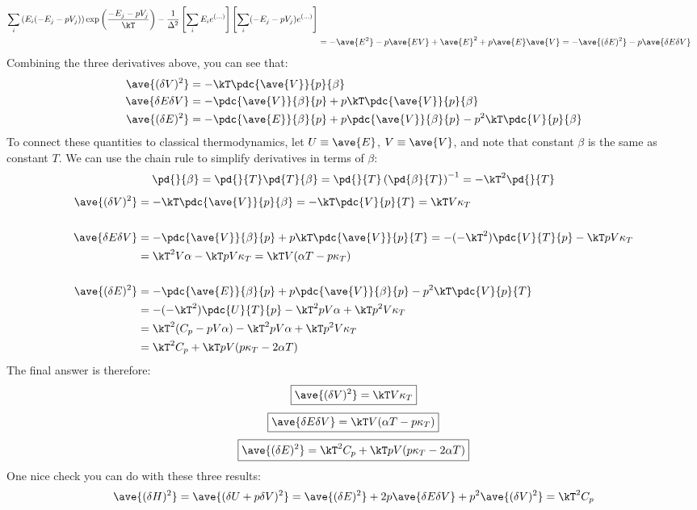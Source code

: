 {\begin{align*}
    \sum_i \left( E_i (-E_j - p V_j) \right) 
    \exp \left( \frac{-E_j - p V_j}{\kT} \right)
  - \frac{1}{\Delta^2} \left[ \sum_i E_i 
    e^{\left( \ldots \right)} \right] 
    \left[ \sum_i (-E_j - p V_j)
    e^{\left( \ldots \right)} \right] \\
 &= -\ave{E^2} - p\ave{E V} + \ave{E}^2 + p\ave{E}\ave{V}
  = -\ave{(\delta E)^2} -p \ave{\delta E \delta V}
\end{align*}
Combining the three derivatives above, you can see that:
\begin{align*}
  \ave{(\delta V)^2} &= 
      -\kT \pdc{\ave{V}}{p}{\beta} \\
  \ave{\delta E \delta V} &= 
      -\pdc{\ave{V}}{\beta}{p} + p\kT \pdc{\ave{V}}{p}{\beta} \\
  \ave{(\delta E)^2} &= 
      -\pdc{\ave{E}}{\beta}{p} + p \pdc{\ave{V}}{\beta}{p} 
     - p^2 \kT \pdc{V}{p}{\beta} \\
\end{align*}
To connect these quantities to classical thermodynamics,
let $U \equiv \ave{E}$, $V \equiv \ave{V}$, and note
that constant $\beta$ is the same as constant $T$. 
We can use the chain rule to simplify derivatives in terms of $\beta$:
\[ \pd{}{\beta} = \pd{}{T} \pd{T}{\beta} 
 = \pd{}{T} \left( \pd{\beta}{T} \right)^{-1} = -\kT^2 \pd{}{T} \]
\begin{align*} 
  \ave{(\delta V)^2} &= 
  - \kT \pdc{\ave{V}}{p}{\beta} 
  = -\kT \pdc{V}{p}{T} = \kT V \kappa_T \\ \\
  \ave{\delta E \delta V} &= 
  - \pdc{\ave{V}}{\beta}{p} + p\kT \pdc{\ave{V}}{p}{T} 
  = - (-\kT^2) \pdc{V}{T}{p} - \kT pV \kappa_T \\ 
 &= \kT^2 V \alpha - \kT pV \kappa_T 
  = \kT V ( \alpha T - p \kappa_T) \\ \\
  \ave{(\delta E)^2} &= 
  - \pdc{\ave{E}}{\beta}{p} + p \pdc{\ave{V}}{\beta}{p} 
  - p^2 \kT \pdc{V}{p}{T} \\
 &= -(-\kT^2) \pdc{U}{T}{p} - \kT^2 p V \alpha + \kT p^2 V \kappa_T \\
 &= \kT^2 (C_p- p V \alpha) - \kT^2 p V \alpha + \kT p^2 V \kappa_T \\
 &= \kT^2 C_p + \kT pV (p \kappa_T - 2 \alpha T)
\end{align*}
The final answer is therefore:
\[ \boxed{ \ave{(\delta V)^2} 
         = \kT V \kappa_T  } \]
\[ \boxed{ \ave{\delta E \delta V}
         =  \kT V ( \alpha T - p \kappa_T)  } \]
\[ \boxed{ \ave{(\delta E)^2} 
         = \kT^2 C_p + \kT pV (p \kappa_T - 2 \alpha T) } \]
One nice check you can do with these three results:
\[ \ave{(\delta H)^2} = \ave{(\delta U + p \delta V)^2} 
 = \ave{(\delta E)^2} + 2 p \ave{\delta E \delta V} 
 + p^2 \ave{(\delta V)^2} = \kT^2 C_p \]
\newpage
}


